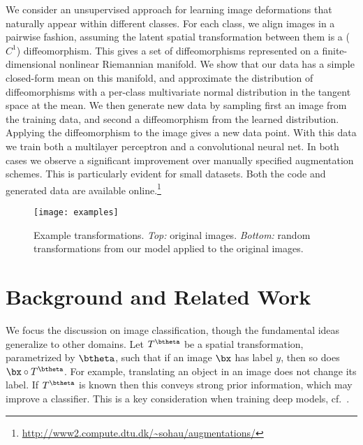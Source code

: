 \documentclass[twoside]{article}
\begin{document}
  We consider an unsupervised approach for learning image deformations
  that naturally appear within different classes. 
  For each class, we align images in a pairwise fashion, assuming the latent
  spatial transformation between them is a ($C^1$) diffeomorphism.
  This gives a set of diffeomorphisms represented
  on a finite-dimensional nonlinear Riemannian manifold. We show that our data has a simple
  closed-form mean on this manifold, and approximate the distribution of
  diffeomorphisms with a per-class multivariate normal distribution in
  the tangent space at the mean. We then generate new data
  by sampling first an image from the training data, and second a diffeomorphism
  from the learned distribution.
  Applying the diffeomorphism to the image gives a new data point.
  With this data we train both a multilayer perceptron and a convolutional neural net.
  In both cases we observe a significant
  improvement over manually specified augmentation schemes. This is particularly
  evident for small datasets.
  Both the code and generated data are available 
online.\footnote{\url{http://www2.compute.dtu.dk/~sohau/augmentations/}}\begin{figure*}[t]
    \texttt{[image: examples]}
    \caption{Example transformations.
      \emph{Top:} original images.
      \emph{Bottom:} random transformations from our model applied to the original images.}
    \label{fig:examples}
  \end{figure*}
  \section{Background and Related Work}\label{sec:background}
  We focus the discussion on image classification, though the fundamental ideas
  generalize to other domains.
    Let $T^{\btheta}$ 
  be a spatial transformation, parametrized by $\btheta$,
  such that if an image $\bx$ has label $y$, then
  so does  $\bx \circ T^{\btheta} $.
  For example, translating an
  object in an image does not change its label. If $T^{\btheta}$ is known
  then this conveys strong prior information, which may improve a classifier.
  This is a key consideration when training deep models, cf.~\cite{goodfellow2009measuring}.
\end{document}
